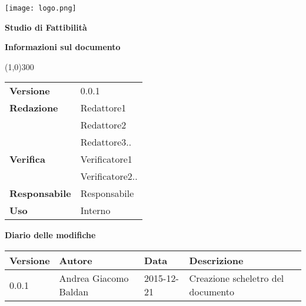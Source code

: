 \documentclass{scalatekids-article}
\begin{document}
\begin{titlepage}
  \centering
  \texttt{[image: logo.png]}\par\vspace{1cm}
  \vspace{1.5cm}
         {\Huge\bfseries Studio di Fattibilità \par}
         \begin{center}
           \vspace{1.0cm}
                  {\large\bfseries Informazioni sul documento \par}
         \end{center}
         \vspace{-1cm}
         \begin{center}
           \line(1,0){300}
         \end{center}
         \vspace{0cm}
         \begin{tabular}[c]{l|l}
           \textbf{Versione} & 0.0.1\\
           \textbf{Redazione} & Redattore1\\ & Redattore2\\ & Redattore3..\\
           \textbf{Verifica} & Verificatore1\\ & Verificatore2..\\
           \textbf{Responsabile} & Responsabile\\
           \textbf{Uso} & Interno
         \end{tabular}
\end{titlepage}
\clearpage
\setcounter{page}{1}
\begin{flushleft}
  \vspace{0cm}
         {\large\bfseries Diario delle modifiche \par}
\end{flushleft}
\vspace{0cm}
\begin{center}
  \begin{tabular}{|l | l | l | l |}
    \hline
    Versione & Autore & Data & Descrizione \\
    \hline
    0.0.1 & Andrea Giacomo Baldan & 2015-12-21 & Creazione scheletro del documento\\
    \hline
  \end{tabular}
\end{center}
\tableofcontents
\end{document}
